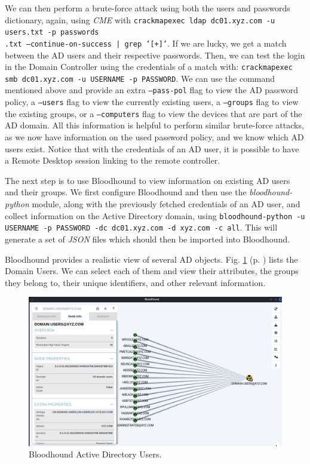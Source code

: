 We can then perform a brute-force attack using both the users and passwords dictionary, again, using \textit{CME} with \texttt{crackmapexec ldap dc01.xyz.com -u users.txt -p passwords\\.txt ---continue-on-success | grep '[+]'}. If we are lucky, we get a match between the AD users and their respective passwords. Then, we can test the login in the Domain Controller using the credentials of a match with: \texttt{crackmapexec smb dc01.xyz.com -u USERNAME -p PASSWORD}. We can use the command mentioned above and provide an extra \texttt{---pass-pol} flag to view the AD password policy, a \texttt{---users} flag to view the currently existing users, a \texttt{---groups} flag to view the existing groups, or a \texttt{---computers} flag to view the devices that are part of the AD domain. All this information is helpful to perform similar brute-force attacks, as we now have information on the used password policy, and we know which AD users exist. Notice that with the credentials of an AD user, it is possible to have a Remote Desktop session linking to the remote controller.

The next step is to use Bloodhound to view information on existing AD users and their groups. We first configure Bloodhound and then use the \textit{bloodhound-python} module, along with the previously fetched credentials of an AD user, and collect information on the Active Directory domain, using \texttt{bloodhound-python -u USERNAME -p PASSWORD -dc dc01.xyz.com -d xyz.com -c all}. This will generate a set of \textit{JSON} files which should then be imported into Bloodhound.

Bloodhound provides a realistic view of several AD objects. Fig. \ref{fig:bloodhound_ad_users} (p. \pageref{fig:bloodhound_ad_users}) lists the Domain Users. We can select each of them and view their attributes, the groups they belong to, their unique identifiers, and other relevant information.

\begin{figure}[H]
    \includegraphics[width=12cm]{figures/bloodhound_ad_users.png}
    \caption{Bloodhound Active Directory Users.}
    \label{fig:bloodhound_ad_users}
\end{figure}

